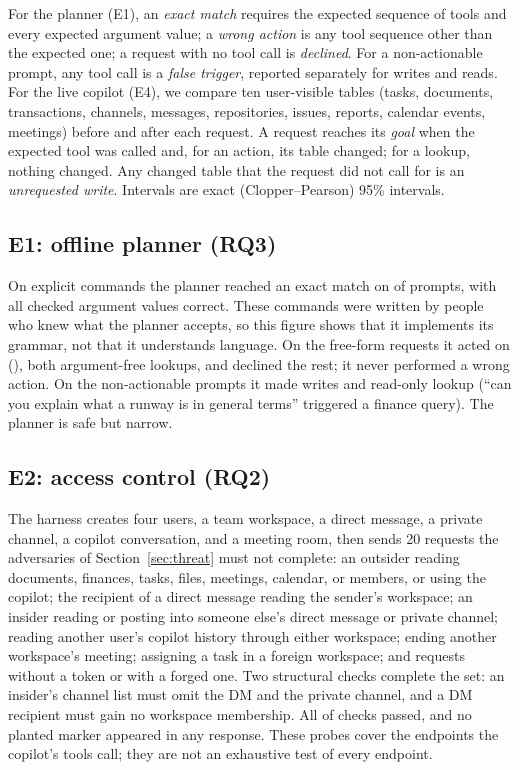 \documentclass[conference]{IEEEtran}
\begin{document}
For the planner (E1), an \emph{exact match} requires the expected sequence of tools and every expected argument value; a \emph{wrong action} is any tool sequence other than the expected one; a request with no tool call is \emph{declined}. For a non-actionable prompt, any tool call is a \emph{false trigger}, reported separately for writes and reads. For the live copilot (E4), we compare ten user-visible tables (tasks, documents, transactions, channels, messages, repositories, issues, reports, calendar events, meetings) before and after each request. A request reaches its \emph{goal} when the expected tool was called and, for an action, its table changed; for a lookup, nothing changed. Any changed table that the request did not call for is an \emph{unrequested write}. Intervals are exact (Clopper--Pearson) 95\% intervals.

\subsection{E1: offline planner (RQ3)}
On explicit commands the planner reached an exact match on \eOneCmdExact{} of \eOneCmdN{} prompts, with all \eOneCmdArgs{} checked argument values correct. These commands were written by people who knew what the planner accepts, so this figure shows that it implements its grammar, not that it understands language. On the \eOneFreeN{} free-form requests it acted on \eOneFreeActed{} (\eOneFreeExact{}), both argument-free lookups, and declined the rest; it never performed a wrong action. On the \eOneNoneN{} non-actionable prompts it made \eOneNoneWrites{} writes and \eOneNoneReads{} read-only lookup (``can you explain what a runway is in general terms'' triggered a finance query). The planner is safe but narrow.

\subsection{E2: access control (RQ2)}
The harness creates four users, a team workspace, a direct message, a private channel, a copilot conversation, and a meeting room, then sends 20 requests the adversaries of Section~\ref{sec:threat} must not complete: an outsider reading documents, finances, tasks, files, meetings, calendar, or members, or using the copilot; the recipient of a direct message reading the sender's workspace; an insider reading or posting into someone else's direct message or private channel; reading another user's copilot history through either workspace; ending another workspace's meeting; assigning a task in a foreign workspace; and requests without a token or with a forged one. Two structural checks complete the set: an insider's channel list must omit the DM and the private channel, and a DM recipient must gain no workspace membership. All \eTwoBlocked{} of \eTwoProbes{} checks passed, and no planted marker appeared in any response. These probes cover the endpoints the copilot's tools call; they are not an exhaustive test of every endpoint.
\end{document}
